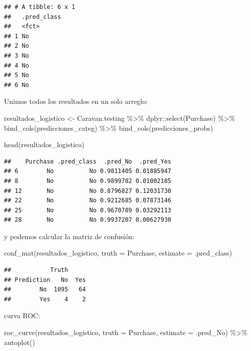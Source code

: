 \documentclass[
  12pt,
]{book}
\newenvironment{Shaded}{\begin{snugshade}}{\end{snugshade}}
\newcommand{\AttributeTok}[1]{\textcolor[rgb]{0.77,0.63,0.00}{#1}}
\newcommand{\FunctionTok}[1]{\textcolor[rgb]{0.00,0.00,0.00}{#1}}
\newcommand{\NormalTok}[1]{#1}
\newcommand{\OtherTok}[1]{\textcolor[rgb]{0.56,0.35,0.01}{#1}}
\newcommand{\SpecialCharTok}[1]{\textcolor[rgb]{0.00,0.00,0.00}{#1}}
\theoremstyle{definition}
\theoremstyle{definition}
\theoremstyle{definition}
\theoremstyle{definition}
\theoremstyle{remark}
\begin{document}
\begin{verbatim}
## # A tibble: 6 x 1
##   .pred_class
##   <fct>      
## 1 No         
## 2 No         
## 3 No         
## 4 No         
## 5 No         
## 6 No
\end{verbatim}

Unimos todos los resultados en un solo arreglo:

\begin{Shaded}
\begin{Highlighting}[]
\NormalTok{resultados\_logistico }\OtherTok{\textless{}{-}}\NormalTok{ Caravan.testing }\SpecialCharTok{\%\textgreater{}\%}
\NormalTok{    dplyr}\SpecialCharTok{::}\FunctionTok{select}\NormalTok{(Purchase) }\SpecialCharTok{\%\textgreater{}\%}
    \FunctionTok{bind\_cols}\NormalTok{(predicciones\_categ) }\SpecialCharTok{\%\textgreater{}\%}
    \FunctionTok{bind\_cols}\NormalTok{(predicciones\_probs)}

\FunctionTok{head}\NormalTok{(resultados\_logistico)}
\end{Highlighting}
\end{Shaded}

\begin{verbatim}
##    Purchase .pred_class  .pred_No  .pred_Yes
## 6        No          No 0.9811405 0.01885947
## 8        No          No 0.9899782 0.01002185
## 12       No          No 0.8796827 0.12031730
## 22       No          No 0.9212685 0.07873146
## 25       No          No 0.9670789 0.03292113
## 28       No          No 0.9937207 0.00627930
\end{verbatim}

y podemos calcular la matriz de confusión:

\begin{Shaded}
\begin{Highlighting}[]
\FunctionTok{conf\_mat}\NormalTok{(resultados\_logistico, }\AttributeTok{truth =}\NormalTok{ Purchase, }\AttributeTok{estimate =}\NormalTok{ .pred\_class)}
\end{Highlighting}
\end{Shaded}

\begin{verbatim}
##           Truth
## Prediction   No  Yes
##        No  1095   64
##        Yes    4    2
\end{verbatim}

curva ROC:

\begin{Shaded}
\begin{Highlighting}[]
\FunctionTok{roc\_curve}\NormalTok{(resultados\_logistico, }\AttributeTok{truth =}\NormalTok{ Purchase, }\AttributeTok{estimate =}\NormalTok{ .pred\_No) }\SpecialCharTok{\%\textgreater{}\%}
    \FunctionTok{autoplot}\NormalTok{()}
\end{Highlighting}
\end{Shaded}
\end{document}
